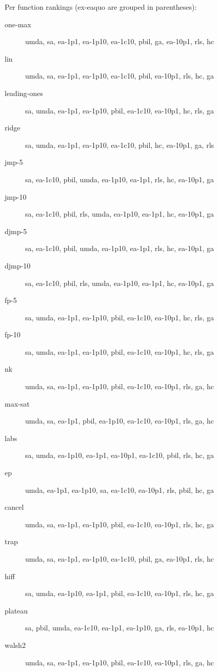 Per function rankings (ex-eaquo are grouped in parentheses):
\begin{description}
\item[one-max]
umda, sa, ea-1p1, ea-1p10, ea-1c10, pbil, ga, ea-10p1, rls, hc

\item[lin]
umda, sa, ea-1p1, ea-1p10, ea-1c10, pbil, ea-10p1, rls, hc, ga

\item[leading-ones]
sa, umda, ea-1p1, ea-1p10, pbil, ea-1c10, ea-10p1, hc, rls, ga

\item[ridge]
sa, umda, ea-1p1, ea-1p10, ea-1c10, pbil, hc, ea-10p1, ga, rls

\item[jmp-5]
sa, ea-1c10, pbil, umda, ea-1p10, ea-1p1, rls, hc, ea-10p1, ga

\item[jmp-10]
sa, ea-1c10, pbil, rls, umda, ea-1p10, ea-1p1, hc, ea-10p1, ga

\item[djmp-5]
sa, ea-1c10, pbil, umda, ea-1p10, ea-1p1, rls, hc, ea-10p1, ga

\item[djmp-10]
sa, ea-1c10, pbil, rls, umda, ea-1p10, ea-1p1, hc, ea-10p1, ga

\item[fp-5]
sa, umda, ea-1p1, ea-1p10, pbil, ea-1c10, ea-10p1, hc, rls, ga

\item[fp-10]
sa, umda, ea-1p1, ea-1p10, pbil, ea-1c10, ea-10p1, hc, rls, ga

\item[nk]
umda, sa, ea-1p1, ea-1p10, pbil, ea-1c10, ea-10p1, rls, ga, hc

\item[max-sat]
umda, sa, ea-1p1, pbil, ea-1p10, ea-1c10, ea-10p1, rls, ga, hc

\item[labs]
sa, umda, ea-1p10, ea-1p1, ea-10p1, ea-1c10, pbil, rls, hc, ga

\item[ep]
umda, ea-1p1, ea-1p10, sa, ea-1c10, ea-10p1, rls, pbil, hc, ga

\item[cancel]
umda, sa, ea-1p1, ea-1p10, pbil, ea-1c10, ea-10p1, rls, hc, ga

\item[trap]
umda, sa, ea-1p1, ea-1p10, ea-1c10, pbil, ga, ea-10p1, rls, hc

\item[hiff]
sa, umda, ea-1p10, ea-1p1, pbil, ea-1c10, ea-10p1, rls, hc, ga

\item[plateau]
sa, pbil, umda, ea-1c10, ea-1p1, ea-1p10, ga, rls, ea-10p1, hc

\item[walsh2]
umda, sa, ea-1p1, ea-1p10, pbil, ea-1c10, ea-10p1, rls, ga, hc

\end{description}
